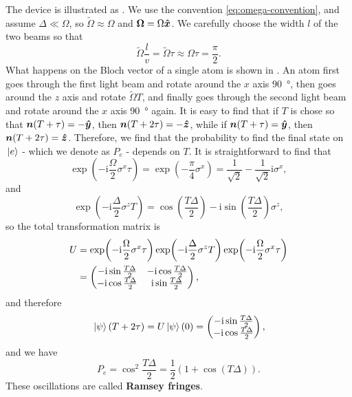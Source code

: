 \documentclass[hyperref, a4paper]{article}
\newcommand*{\ii}{\mathrm{i}}
\newcommand*{\concept}[1]{{\textbf{#1}}}
\begin{document}
The device is illustrated as . We use the convention \eqref{eq:omega-convention}, and assume 
$\Delta \ll \Omega$, so $\tilde{\Omega} \approx \Omega$ and $\vb*{\Omega} = \Omega \vu*{x}$. We carefully 
choose the width $l$ of the two beams so that 
\begin{equation}
    \tilde{\Omega} \frac{l}{v} = \tilde{\Omega} \tau \approx \Omega \tau = \frac{\pi}{2}.
\end{equation}
What happens on the Bloch vector of a single atom is shown in . An atom first 
goes through the first light beam and rotate around the $x$ axis \SI{90}{\degree}, then goes around the $z$ 
axis and rotate $\tilde{\Omega} T$, and finally goes through the second light beam and rotate around the $x$
axis \SI{90}{\degree} again. It is easy to find that if $T$ is chose so that $\vb*{n}(T + \tau) = - \vu*{y}$,
then $\vb*{n}(T + 2 \tau) = - \vu*{z}$, while if $\vb*{n}(T + \tau) = \vu*{y}$, then $\vb*{n}(T + 2 \tau) = \vu*{z}$.
Therefore, we find that the probability to find the final state on $\ket*{e}$ - which we denote as $P_e$ - depends
on $T$. It is straightforward to find that 
\[
    \exp(-\ii \frac{\Omega}{2} \sigma^x \tau) = \exp(- \frac{\pi}{4} \sigma^x) = \frac{1}{\sqrt{2}} - \frac{1}{\sqrt{2}} \ii \sigma^x,
\]
and 
\[
    \exp(- \ii \frac{\Delta}{2} \sigma^z T) = \cos(\frac{T \Delta}{2}) - \ii \sin(\frac{T \Delta}{2}) \sigma^z,
\]
so the total transformation matrix is 
\begin{equation}
    \begin{aligned}
        U &= \exp(-\ii \frac{\Omega}{2} \sigma^x \tau) \exp(- \ii \frac{\Delta}{2} \sigma^z T) \exp(-\ii \frac{\Omega}{2} \sigma^x \tau) \\
        &= \pmqty{ - \ii \sin \frac{T \Delta}{2} & - \ii \cos \frac{T \Delta}{2} \\ - \ii \cos \frac{T \Delta}{2} & \ii \sin \frac{T \Delta}{2} },
    \end{aligned}
\end{equation}
and therefore 
\begin{equation}
    \ket*{\psi}(T + 2\tau) = U \ket*{\psi}(0) = \pmqty{ - \ii \sin \frac{T \Delta}{2} \\ - \ii \cos \frac{T \Delta}{2} },
\end{equation}
and we have 
\begin{equation}
    P_e = \cos^2 \frac{T \Delta}{2} = \frac{1}{2} (1 + \cos(T \Delta)).
\end{equation}
These oscillations are called \concept{Ramsey fringes}. 
\end{document}
